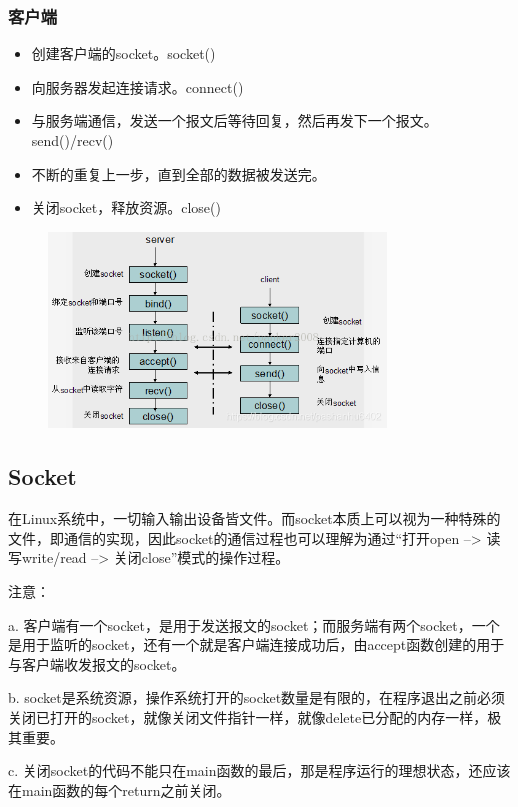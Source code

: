 \documentclass[UTF8]{article}%
\begin{document}
\subsubsection{客户端}

\begin{itemize}
    \item 创建客户端的socket。socket()
    \item 向服务器发起连接请求。connect()
    \item 与服务端通信，发送一个报文后等待回复，然后再发下一个报文。send()/recv()
    \item 不断的重复上一步，直到全部的数据被发送完。
    \item 关闭socket，释放资源。close()
\end{itemize}

\begin{figure}[htb!]%
    \includegraphics[width=0.8\textwidth]{2.3-1.png}
\end{figure}

\subsection{Socket}

在Linux系统中，一切输入输出设备皆文件。而socket本质上可以视为一种特殊的文件，即通信的实现，因此socket的通信过程也可以理解为通过“打开open –> 读写write/read –> 关闭close”模式的操作过程。

注意：

a. 客户端有一个socket，是用于发送报文的socket；而服务端有两个socket，一个是用于监听的socket，还有一个就是客户端连接成功后，由accept函数创建的用于与客户端收发报文的socket。

b. socket是系统资源，操作系统打开的socket数量是有限的，在程序退出之前必须关闭已打开的socket，就像关闭文件指针一样，就像delete已分配的内存一样，极其重要。

c. 关闭socket的代码不能只在main函数的最后，那是程序运行的理想状态，还应该在main函数的每个return之前关闭。
\end{document}
